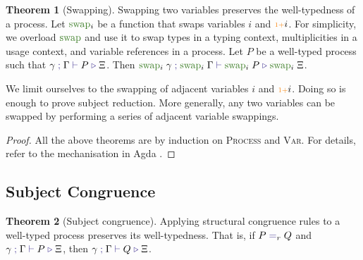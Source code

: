 \documentclass[a4paper,UKenglish,cleveref,autoref,thm-restate,authorcolumns]{lipics-v2019}
\theoremstyle{definition}
\newtheorem{nitheorem}{Theorem}
\newcommand{\type}[1]{\textcolor{BlueViolet}{\operatorname{#1}}}
\newcommand{\constr}[1]{\textcolor{BurntOrange}{\operatorname{#1}}}
\newcommand{\func}[1]{\textcolor{OliveGreen}{\operatorname{#1}}}
\newcommand{\suc}{\constr{\scriptstyle 1+}}
\newcommand{\types}[4]{#1 \; \type{;} \; #2 \; \type{\vdash} \; #3 \; \type{\triangleright} \; #4}
\newcommand{\eq}[1]{\; \type{=}_{#1} \;}
\begin{document}
\begin{nitheorem}[Swapping]
  \label{thm:swapping}
  Swapping two variables preserves the well-typedness of a process.
  Let $\func{swap}_i$ be a function that swaps variables $i$ and $\suc i$.
  For simplicity, we overload $\func{swap}$ and use it to swap types in a typing context, multiplicities in a usage context, and variable references in a process.
  \todo{}
  Let $P$ be a well-typed process such that $\types{\gamma}{\Gamma}{P}{\Xi}$.
  Then $\types{\func{swap}_i \; \gamma}{\func{swap}_i \; \Gamma}{\func{swap}_i \; P}{\func{swap}_i \; \Xi}$.
\end{nitheorem}

\begin{remark}
  We limit ourselves to the swapping of adjacent variables $i$ and $\suc i$.
  Doing so is enough to prove subject reduction.
  More generally, any two variables can be swapped by performing a series of adjacent variable swappings.
\end{remark}

\begin{proof}
  All the above theorems are by induction on \textsc{Process} and \textsc{Var}.
  For details, refer to the mechanisation in Agda \cite{Zalakain2020Agda}.
\end{proof}


\subsection{Subject Congruence}
\label{subject-congruence}

\begin{nitheorem}[Subject congruence]
  \label{thm:subject-congruence}
  Applying structural congruence rules to a well-typed process preserves its well-typedness.
  That is, if $P \eq{r} Q$ and $\types{\gamma}{\Gamma}{P}{\Xi}$, then $\types{\gamma}{\Gamma}{Q}{\Xi}$.
\end{nitheorem}
\end{document}
